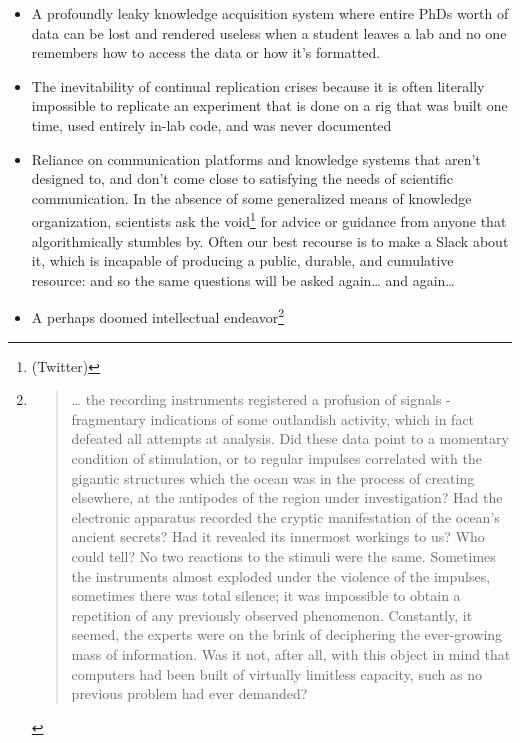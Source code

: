 \begin{itemize}
\tightlist
\item
  A profoundly leaky knowledge acquisition system where entire PhDs
  worth of data can be lost and rendered useless when a student leaves a
  lab and no one remembers how to access the data or how it's formatted.
\item
  The inevitability of continual replication crises because it is often
  literally impossible to replicate an experiment that is done on a rig
  that was built one time, used entirely in-lab code, and was never
  documented
\item
  Reliance on communication platforms and knowledge systems that aren't
  designed to, and don't come close to satisfying the needs of
  scientific communication. In the absence of some generalized means of
  knowledge organization, scientists ask the void\footnote{(Twitter)}
  for advice or guidance from anyone that algorithmically stumbles by.
  Often our best recourse is to make a Slack about it, which is
  incapable of producing a public, durable, and cumulative resource: and
  so the same questions will be asked again\ldots{} and again\ldots{}
\item
  A perhaps doomed intellectual endeavor\footnote{\begin{quote}
    \ldots{} the recording instruments registered a profusion of signals
    - fragmentary indications of some outlandish activity, which in fact
    defeated all attempts at analysis. Did these data point to a
    momentary condition of stimulation, or to regular impulses
    correlated with the gigantic structures which the ocean was in the
    process of creating elsewhere, at the antipodes of the region under
    investigation? Had the electronic apparatus recorded the cryptic
    manifestation of the ocean's ancient secrets? Had it revealed its
    innermost workings to us? Who could tell? No two reactions to the
    stimuli were the same. Sometimes the instruments almost exploded
    under the violence of the impulses, sometimes there was total
    silence; it was impossible to obtain a repetition of any previously
    observed phenomenon. Constantly, it seemed, the experts were on the
    brink of deciphering the ever-growing mass of information. Was it
    not, after all, with this object in mind that computers had been
    built of virtually limitless capacity, such as no previous problem
    had ever demanded?


\end{quote}}
\end{itemize}

